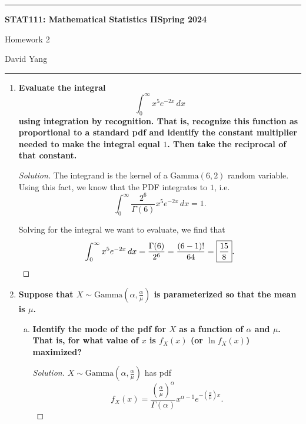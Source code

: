 \documentclass[11pt]{article}
\newenvironment{solution}
  {\renewcommand\qedsymbol{$\blacksquare$}\begin{proof}[Solution]}
  {\end{proof}}
\begin{document}
	\hrule
	\begin{center}
        \textbf{STAT111: Mathematical Statistics II}\hfill \textbf{Spring 2024}\newline

		{\Large Homework 2}

		David Yang
	\end{center}

\hrule

\vspace{1em}

\begin{enumerate}
    \item \textbf{Evaluate the integral}
    \[
        \int_0^{\infty} x^5 e^{-2x} \, dx
    \] 
    \textbf{using integration by recognition. That is, recognize this function as proportional to a standard pdf 
    and identify the constant multiplier needed to make the integral equal $1$. Then take the reciprocal of that constant.}

    \begin{solution}
    The integrand is the kernel of a $\mathrm{Gamma}(6, 2)$ random variable. \\

    Using this fact, we know that the PDF integrates to $1$, i.e.
    \[
        \int_0^{\infty} \frac{2^6}{\Gamma(6)}x^5 e^{-2x} \, dx = 1.
    \] 
    
    Solving for the integral we want to evaluate, we find that
    \[
        \int_0^{\infty} x^5 e^{-2x} \, dx = \frac{\Gamma(6)}{2^6} = \frac{(6-1)!}{64} = \boxed{\frac{15}{8}}. \qedhere
    \] 
    \end{solution}

\newpage

    \item \textbf{Suppose that $X \sim \mathrm{Gamma}\left(\alpha, \frac{\alpha}{\mu}\right)$ is parameterized so that the mean is $\mu$.}
    
    \begin{enumerate}[a)]
        \item \textbf{Identify the mode of the pdf for $X$ as a function of $\alpha$ and $\mu$. That is, for what value of $x$ is $f_X(x)$ (or $\ln f_X(x)$) maximized?} 
    
        \begin{solution}
        $X \sim \mathrm{Gamma}\left(\alpha, \frac{\alpha}{\mu}\right)$ has pdf 
        \[
            f_X(x) = \frac{\left( \frac{\alpha}{\mu} \right)^{\alpha} }{\Gamma(\alpha)} x^{\alpha - 1} e^{-\left( \frac{\alpha}{\mu} \right)x}.
        \]


\end{solution}
\end{enumerate}
\end{enumerate}
\end{document}
